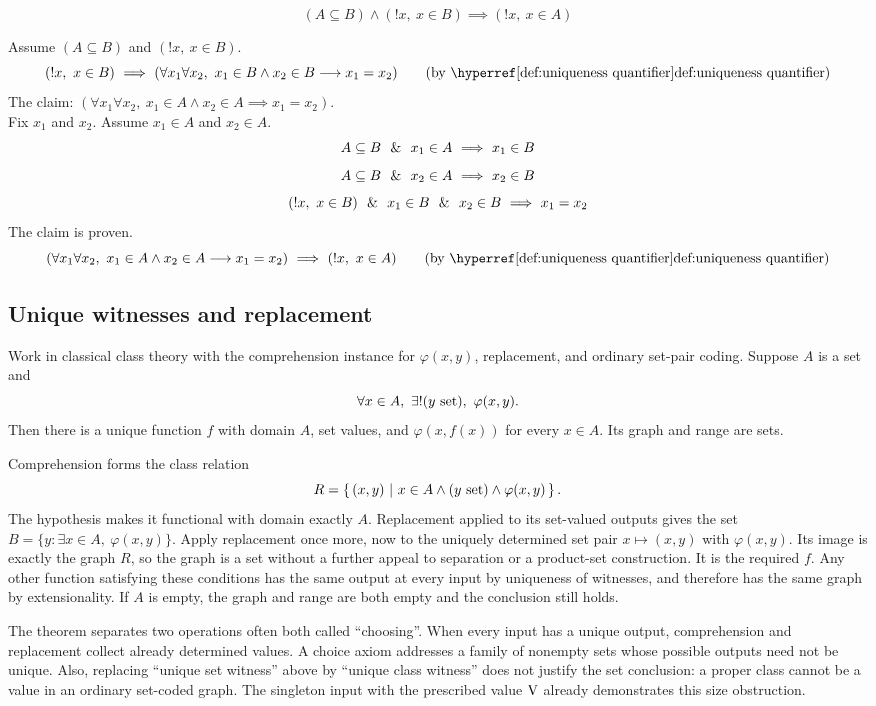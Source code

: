 \begin{theorem}
\[
(A\subseteq B)\land(!x,\ x\in B)\implies (!x,\ x\in A)
\]
\end{theorem}
\Proof
Assume $(A\subseteq B)$ and $(!x,\ x\in B)$.
\[
(!x,\ x\in B)
\IMPLIES
(\forall x_1\forall x_2,\  x_1\in B \land x_2\in B \implies x_1=x_2)
\tag{by \myref{def:uniqueness quantifier}}
\]
The claim: $(\forall x_1\forall x_2,\  x_1\in A \land x_2\in A \implies x_1=x_2)$.\\
Fix $x_1$ and $x_2$.
Assume $x_1\in A$ and $x_2\in A$.
\[
A\subseteq B
\ \ \&\ \ 
x_1\in A
\ \Longrightarrow\ 
x_1\in B
\]
\[
A\subseteq B
\ \ \&\ \ 
x_2\in A
\ \Longrightarrow\ 
x_2\in B
\]
\[
(!x,\ x\in B)
\ \ \&\ \ 
x_1\in B
\ \ \&\ \ 
x_2\in B
\ \Longrightarrow\ 
x_1=x_2
\]
The claim is proven.
\[
(\forall x_1\forall x_2,\ x_1\in A \land x_2\in A \implies x_1=x_2)
\IMPLIES
(!x,\ x\in A)
\tag{by \myref{def:uniqueness quantifier}}
\]
\Done

\subsection{Unique witnesses and replacement}
\begin{theorem}
Work in classical class theory with the comprehension instance for
$\varphi(x,y)$, replacement, and ordinary set-pair coding. Suppose $A$
is a set and
\[
\forall x\in A,\ \exists! (y\mathrm{\ set}),\ \varphi(x,y).
\]
Then there is a unique function $f$ with domain $A$, set values, and
$\varphi(x,f(x))$ for every $x\in A$. Its graph and range are sets.
\end{theorem}
\Proof
Comprehension forms the class relation
\[
R=\left\{\,(x,y)\ \middle|\ x\in A\land(y\mathrm{\ set})\land\varphi(x,y)\,\right\}.
\]
The hypothesis makes it functional with domain exactly $A$.
Replacement applied to its set-valued outputs gives the set
$B=\{y:\exists x\in A,\ \varphi(x,y)\}$.
Apply replacement once more, now to the uniquely determined set pair
$x\mapsto(x,y)$ with $\varphi(x,y)$. Its image is exactly the graph
$R$, so the graph is a set without a further appeal to separation or
a product-set construction. It is the required $f$. Any other function satisfying these
conditions has the same output at every input by uniqueness of witnesses,
and therefore has the same graph by extensionality. If $A$ is empty,
the graph and range are both empty and the conclusion still holds.
\Done

The theorem separates two operations often both called ``choosing''.
When every input has a unique output, comprehension and replacement
collect already determined values. A choice axiom addresses a family of
nonempty sets whose possible outputs need not be unique. Also, replacing
``unique set witness'' above by ``unique class witness'' does not justify
the set conclusion: a proper class cannot be a value in an ordinary
set-coded graph. The singleton input with the prescribed value $\mathrm{V}$
already demonstrates this size obstruction.

